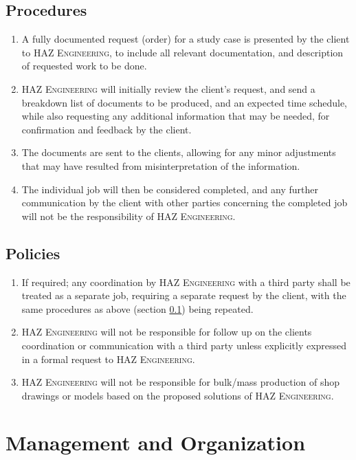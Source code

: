 \documentclass[a4paper,oneside,12pt,final]{article}
\begin{document}
\subsection{Procedures}
\label{sec:procedures}
\begin{enumerate}
	\item A fully documented request (order) for a study case is presented by the client to \textsc{HAZ Engineering}, to include all relevant documentation, and description of requested work to be done.
	\item \textsc{HAZ Engineering} will initially review the client's request, and send a breakdown list of documents to be produced, and an expected time schedule, while also requesting any additional information that may be needed, for confirmation and feedback by the client.
	\item The documents are sent to the clients, allowing for any minor adjustments that may have resulted from misinterpretation of the information.
	\item The individual job will then be considered completed, and any further communication by the client with other parties concerning the completed job will not be the responsibility of \textsc{HAZ Engineering}.
\end{enumerate}

\subsection{Policies}
\begin{enumerate}
	\item If required; any coordination by \textsc{HAZ Engineering} with a third party shall be treated as a separate job, requiring a separate request by the client, with the same procedures as above (section \ref{sec:procedures}) being repeated.
	\item \textsc{HAZ Engineering} will not be responsible for follow up on the clients coordination or communication with a third party unless explicitly expressed in a formal request to \textsc{HAZ Engineering}.
	\item \textsc{HAZ Engineering} will not be responsible for bulk/mass production of shop drawings or models based on the proposed solutions of \textsc{HAZ Engineering}.
\end{enumerate}

\section{Management and Organization}
\end{document}
